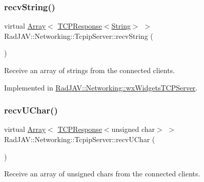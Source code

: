 \subsubsection{\texorpdfstring{recv\+String()}{recvString()}\hspace{0.1cm}{\footnotesize\ttfamily [2/2]}}
{\footnotesize\ttfamily virtual \mbox{\hyperlink{class_rad_j_a_v_1_1_array}{Array}}$<$ \mbox{\hyperlink{class_rad_j_a_v_1_1_networking_1_1_t_c_p_response}{T\+C\+P\+Response}}$<$\mbox{\hyperlink{class_rad_j_a_v_1_1_string}{String}}$>$ $>$ Rad\+J\+A\+V\+::\+Networking\+::\+Tcpip\+Server\+::recv\+String (\begin{DoxyParamCaption}{ }\end{DoxyParamCaption})\hspace{0.3cm}{\ttfamily [pure virtual]}}



Receive an array of strings from the connected clients. 



Implemented in \mbox{\hyperlink{class_rad_j_a_v_1_1_networking_1_1wx_widgets_t_c_p_server_a39b86fd7c19dcc9a7f6edb5844207056}{Rad\+J\+A\+V\+::\+Networking\+::wx\+Widgets\+T\+C\+P\+Server}}.

\mbox{\label{class_rad_j_a_v_1_1_networking_1_1_tcpip_server_a40def27a12921b7f399337920b88fdd0}} 
\subsubsection{\texorpdfstring{recv\+U\+Char()}{recvUChar()}}
{\footnotesize\ttfamily virtual \mbox{\hyperlink{class_rad_j_a_v_1_1_array}{Array}}$<$ \mbox{\hyperlink{class_rad_j_a_v_1_1_networking_1_1_t_c_p_response}{T\+C\+P\+Response}}$<$unsigned char$>$ $>$ Rad\+J\+A\+V\+::\+Networking\+::\+Tcpip\+Server\+::recv\+U\+Char (\begin{DoxyParamCaption}{ }\end{DoxyParamCaption})\hspace{0.3cm}{\ttfamily [pure virtual]}}



Receive an array of unsigned chars from the connected clients. 



